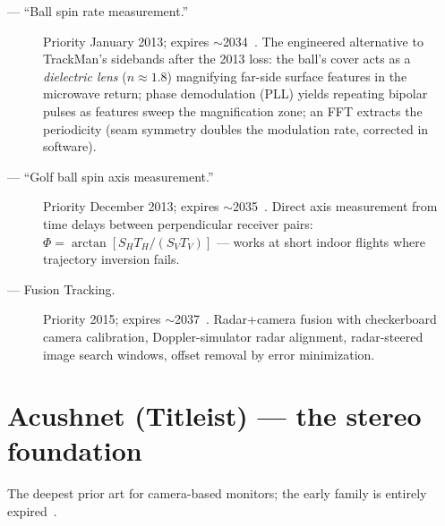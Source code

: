 \begin{description}
\item[ --- ``Ball spin rate measurement.''] Priority
January 2013; expires $\sim$2034~\cite{us9868044}. The engineered
alternative to TrackMan's sidebands after the 2013 loss: the ball's cover
acts as a \emph{dielectric lens} ($n\approx1.8$) magnifying far-side
surface features in the microwave return; phase demodulation (PLL) yields
repeating bipolar pulses as features sweep the magnification zone; an FFT
extracts the periodicity (seam symmetry doubles the modulation rate,
corrected in software).
\item[ --- ``Golf ball spin axis measurement.'']
Priority December 2013; expires $\sim$2035~\cite{us10775492}. Direct
axis measurement from time delays between perpendicular receiver pairs:
$\Phi = \arctan[S_H T_H/(S_V T_V)]$ --- works at short indoor flights
where trajectory inversion fails.
\item[ --- Fusion Tracking.] Priority 2015; expires
$\sim$2037~\cite{us10338209}. Radar+camera fusion with checkerboard
camera calibration, Doppler-simulator radar alignment, radar-steered
image search windows, offset removal by error minimization.
\end{description}

\section{Acushnet (Titleist) --- the stereo foundation}
\label{sec:patentacushnet}

The deepest prior art for camera-based monitors; the early family is
entirely expired~\cite{us5501463,us6500073,us6758759}.

